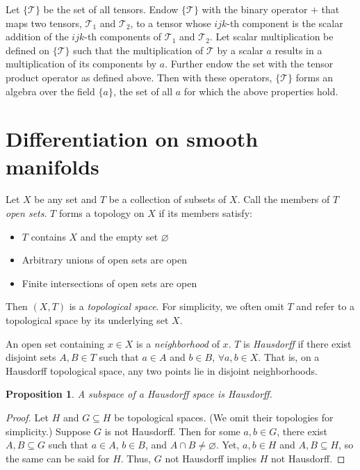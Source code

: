 \documentclass{article}
\newtheorem{proposition}{Proposition}[section]
\begin{document}
Let $\{\mathcal{T}\}$ be the set of all tensors. Endow $\{\mathcal{T}\}$ with the binary operator $+$ that maps two tensors, $\mathcal{T}_1$ and $\mathcal{T}_2$, to a tensor whose $ijk$-th component is the scalar addition of the $ijk$-th components of $\mathcal{T}_1$ and $\mathcal{T}_2$. Let scalar multiplication be defined on $\{\mathcal{T}\}$ such that the multiplication of $\mathcal{T}$ by a scalar $a$ results in a multiplication of its components by $a$. Further endow the set with the tensor product operator as defined above. Then with these operators, $\{\mathcal{T}\}$ forms an algebra over the field $\{a\}$, the set of all $a$ for which the above properties hold.

\section{Differentiation on smooth manifolds}

Let $X$ be any set and $T$ be a collection of subsets of $X$. Call the members of $T$ \textit{open sets}. $T$ forms a topology on $X$ if its members satisfy:

\begin{itemize}
\item $T$ contains $X$ and the empty set $\varnothing$
\item Arbitrary unions of open sets are open 
\item Finite intersections of open sets are open
\end{itemize}

Then $(X, T)$ is a \textit{topological space}. For simplicity, we often omit $T$ and refer to a topological space by its underlying set $X$.

An open set containing $x \in X$ is a \textit{neighborhood} of $x$. $T$ is \textit{Hausdorff} if there exist disjoint sets $A, B \in T$ such that $a \in A$ and $b \in B$, $\forall a, b \in X$. That is, on a Hausdorff topological space, any two points lie in disjoint neighborhoods.

\begin{proposition}
A subspace of a Hausdorff space is Hausdorff.
\end{proposition}
\begin{proof}
Let $H$ and $G \subseteq H$ be topological spaces. (We omit their topologies for simplicity.) Suppose $G$ is not Hausdorff. Then for some $a, b \in G$, there exist $A, B \subseteq G$ such that $a \in A$, $b \in B$, and $A \cap B \neq \varnothing$. Yet, $a, b \in H$ and $A, B \subseteq H$, so the same can be said for $H$. Thus, $G$ not Hausdorff implies $H$ not Hausdorff.
\end{proof}
\end{document}
